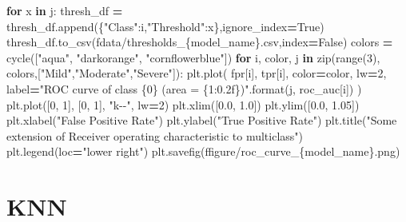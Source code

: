 \documentclass[12pt,twoside]{deuthesis}
\newenvironment{Shaded}{\begin{snugshade}}{\end{snugshade}}
\newcommand{\BuiltInTok}[1]{#1}
\newcommand{\ControlFlowTok}[1]{\textcolor[rgb]{0.13,0.29,0.53}{\textbf{#1}}}
\newcommand{\DecValTok}[1]{\textcolor[rgb]{0.00,0.00,0.81}{#1}}
\newcommand{\FloatTok}[1]{\textcolor[rgb]{0.00,0.00,0.81}{#1}}
\newcommand{\KeywordTok}[1]{\textcolor[rgb]{0.13,0.29,0.53}{\textbf{#1}}}
\newcommand{\NormalTok}[1]{#1}
\newcommand{\OperatorTok}[1]{\textcolor[rgb]{0.81,0.36,0.00}{\textbf{#1}}}
\newcommand{\SpecialCharTok}[1]{\textcolor[rgb]{0.00,0.00,0.00}{#1}}
\newcommand{\SpecialStringTok}[1]{\textcolor[rgb]{0.31,0.60,0.02}{#1}}
\newcommand{\StringTok}[1]{\textcolor[rgb]{0.31,0.60,0.02}{#1}}
\newcommand{\VariableTok}[1]{\textcolor[rgb]{0.00,0.00,0.00}{#1}}
\begin{document}
\begin{Shaded}
\begin{Highlighting}[]
        \ControlFlowTok{for}\NormalTok{ x }\KeywordTok{in}\NormalTok{ j:}
\NormalTok{            thresh\_df }\OperatorTok{=}\NormalTok{ thresh\_df.append(\{}\StringTok{"Class"}\NormalTok{:i,}\StringTok{"Threshold"}\NormalTok{:x\},ignore\_index}\OperatorTok{=}\VariableTok{True}\NormalTok{)}
\NormalTok{    thresh\_df.to\_csv(}\SpecialStringTok{f\textquotesingle{}data/thresholds\_}\SpecialCharTok{\{}\NormalTok{model\_name}\SpecialCharTok{\}}\SpecialStringTok{.csv\textquotesingle{}}\NormalTok{,index}\OperatorTok{=}\VariableTok{False}\NormalTok{)}
\NormalTok{    colors }\OperatorTok{=}\NormalTok{ cycle([}\StringTok{"aqua"}\NormalTok{, }\StringTok{"darkorange"}\NormalTok{, }\StringTok{"cornflowerblue"}\NormalTok{])}
    \ControlFlowTok{for}\NormalTok{ i, color, j }\KeywordTok{in} \BuiltInTok{zip}\NormalTok{(}\BuiltInTok{range}\NormalTok{(}\DecValTok{3}\NormalTok{), colors,[}\StringTok{"Mild"}\NormalTok{,}\StringTok{"Moderate"}\NormalTok{,}\StringTok{"Severe"}\NormalTok{]):}
\NormalTok{        plt.plot(}
\NormalTok{            fpr[i],}
\NormalTok{            tpr[i],}
\NormalTok{            color}\OperatorTok{=}\NormalTok{color,}
\NormalTok{            lw}\OperatorTok{=}\DecValTok{2}\NormalTok{,}
\NormalTok{            label}\OperatorTok{=}\StringTok{"ROC curve of class }\SpecialCharTok{\{0\}}\StringTok{ (area = }\SpecialCharTok{\{1:0.2f\}}\StringTok{)"}\NormalTok{.}\BuiltInTok{format}\NormalTok{(j, roc\_auc[i])}
\NormalTok{        )}
\NormalTok{    plt.plot([}\DecValTok{0}\NormalTok{, }\DecValTok{1}\NormalTok{], [}\DecValTok{0}\NormalTok{, }\DecValTok{1}\NormalTok{], }\StringTok{"k{-}{-}"}\NormalTok{, lw}\OperatorTok{=}\DecValTok{2}\NormalTok{)}
\NormalTok{    plt.xlim([}\FloatTok{0.0}\NormalTok{, }\FloatTok{1.0}\NormalTok{])}
\NormalTok{    plt.ylim([}\FloatTok{0.0}\NormalTok{, }\FloatTok{1.05}\NormalTok{])}
\NormalTok{    plt.xlabel(}\StringTok{"False Positive Rate"}\NormalTok{)}
\NormalTok{    plt.ylabel(}\StringTok{"True Positive Rate"}\NormalTok{)}
\NormalTok{    plt.title(}\StringTok{"Some extension of Receiver operating characteristic to multiclass"}\NormalTok{)}
\NormalTok{    plt.legend(loc}\OperatorTok{=}\StringTok{"lower right"}\NormalTok{)}
\NormalTok{    plt.savefig(}\SpecialStringTok{f\textquotesingle{}figure/roc\_curve\_}\SpecialCharTok{\{}\NormalTok{model\_name}\SpecialCharTok{\}}\SpecialStringTok{.png\textquotesingle{}}\NormalTok{)}
\end{Highlighting}
\end{Shaded}
\normalsize

\hypertarget{knn-1}{%
\section{KNN}\label{knn-1}}
\end{document}
